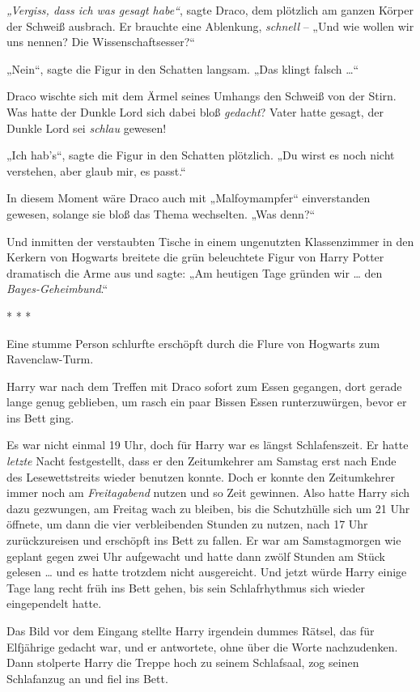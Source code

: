{\emph{„Vergiss, dass ich was gesagt habe“}, sagte Draco, dem plötzlich am ganzen Körper der Schweiß ausbrach. Er brauchte eine Ablenkung, \emph{schnell} -- „Und wie wollen wir uns nennen? Die Wissenschaftsesser?“

„Nein“, sagte die Figur in den Schatten langsam. „Das klingt falsch …“

Draco wischte sich mit dem Ärmel seines Umhangs den Schweiß von der Stirn. Was hatte der Dunkle Lord sich dabei bloß \emph{gedacht}? Vater hatte gesagt, der Dunkle Lord sei \emph{schlau} gewesen!

„Ich hab's“, sagte die Figur in den Schatten plötzlich. „Du wirst es noch nicht verstehen, aber glaub mir, es passt.“

In diesem Moment wäre Draco auch mit „Malfoymampfer“ einverstanden gewesen, solange sie bloß das Thema wechselten. „Was denn?“

Und inmitten der verstaubten Tische in einem ungenutzten Klassenzimmer in den Kerkern von Hogwarts breitete die grün beleuchtete Figur von Harry Potter dramatisch die Arme aus und sagte: „Am heutigen Tage gründen wir … den \emph{Bayes-Geheimbund}.“

* * *

Eine stumme Person schlurfte erschöpft durch die Flure von Hogwarts zum Ravenclaw-Turm.

Harry war nach dem Treffen mit Draco sofort zum Essen gegangen, dort gerade lange genug geblieben, um rasch ein paar Bissen Essen runterzuwürgen, bevor er ins Bett ging.

Es war nicht einmal 19 Uhr, doch für Harry war es längst Schlafenszeit. Er hatte \emph{letzte} Nacht festgestellt, dass er den Zeitumkehrer am Samstag erst nach Ende des Lesewettstreits wieder benutzen konnte. Doch er konnte den Zeitumkehrer immer noch am \emph{Freitagabend} nutzen und so Zeit gewinnen. Also hatte Harry sich dazu gezwungen, am Freitag wach zu bleiben, bis die Schutzhülle sich um 21 Uhr öffnete, um dann die vier verbleibenden Stunden zu nutzen, nach 17 Uhr zurückzureisen und erschöpft ins Bett zu fallen. Er war am Samstagmorgen wie geplant gegen zwei Uhr aufgewacht und hatte dann zwölf Stunden am Stück gelesen … und es hatte trotzdem nicht ausgereicht. Und jetzt würde Harry einige Tage lang recht früh ins Bett gehen, bis sein Schlafrhythmus sich wieder eingependelt hatte.

Das Bild vor dem Eingang stellte Harry irgendein dummes Rätsel, das für Elfjährige gedacht war, und er antwortete, ohne über die Worte nachzudenken. Dann stolperte Harry die Treppe hoch zu seinem Schlafsaal, zog seinen Schlafanzug an und fiel ins Bett.

}
